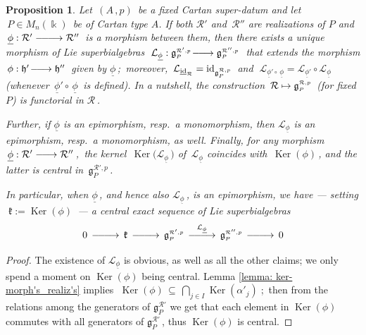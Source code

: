 \documentclass[12pt,reqno,twoside,a4paper]{amsart}
\numberwithin{equation}{section}
\newtheorem{prop}[lema]{Proposition}
\theoremstyle{definition}
\newtheorem{free text}[lema]{}
\theoremstyle{remark}
\newcommand \id{\operatorname{id}}
\newcommand \Ker{\operatorname{Ker}}
\newcommand{\R}{{\mathcal R}}
\newcommand{\Lc}{{\mathcal L}}
\def \Ppicc {{\scriptscriptstyle P}}
\def \lieg{\mathfrak{g}}
\def \liegRpP{\mathfrak{g}^{\raise1pt\hbox{$ \scriptscriptstyle \mathcal{R},p $}}_\Ppicc}
\def \lieh{\mathfrak{h}}
\def \liek{\mathfrak{k}}
\def \pf{\begin{proof}}
\def \epf{\end{proof}}
\theoremstyle{plain}
\begin{document}
\begin{prop}  \label{prop: functor_R->liegRP}
%
 Let  $ \, (A \, , p) \, $  be a fixed Cartan super-datum and let
 $ \, P \in M_n(\Bbbk) \, $ be of Cartan type $A$.
 If both  $ \R' $  and  $ \, \R'' $  are realizations of  $ P $  and
 $ \, \underline{\phi} : \R' \relbar\joinrel\relbar\joinrel\longrightarrow \R'' \, $  is a morphism between them, then there exists a unique morphism of Lie superbialgebras
 $ \; \Lc_{\underline{\phi}} : \lieg^{\scriptscriptstyle \R',p}_\Ppicc \!\relbar\joinrel\longrightarrow \lieg^{\scriptscriptstyle \R'',p}_\Ppicc \; $
 that extends the morphism
 $ \, \phi : \lieh' \!\relbar\joinrel\longrightarrow \lieh'' \, $
 given by  $ \underline{\phi} \, $;  \,moreover,
 $ \, \Lc_{\underline{\id}_\R} = \id_{\liegRpP} \, $  and
 $ \; \Lc_{\underline{\phi}' \circ\, \underline{\phi}} = \Lc_{\underline{\phi}'} \circ \Lc_{\underline{\phi}} \; $
 (whenever  $ \, \underline{\phi}' \circ\, \underline{\phi} \, $  is defined).
 In a nutshell, the construction  $ \, \R \mapsto \liegRpP \, $  (for fixed  $ P $)  is functorial in  $ \R \, $.
                                                                              \par
   Further, if  $ \underline{\phi} $  is an epimorphism, resp.\ a monomorphism, then
  $ \Lc_{\underline{\phi}} $  is an epimorphism, resp.\ a monomorphism, as well.
  Finally, for any morphism
  $ \, \underline{\phi} : \R' \relbar\joinrel\longrightarrow \R'' \, $,
  \,the kernel  $ \, \Ker\big(\Lc_{\underline{\phi}}\,\big) $  of
  $ \, \Lc_{\underline{\phi}} $  coincides with  $ \, \Ker(\phi) \, $,
  and the latter is central in
  $ \, \lieg^{\scriptscriptstyle \R',p}_\Ppicc \, $.
                                                                                \par
   In particular, when  $ \underline{\phi} \, $,  and hence also
   $ \Lc_{\underline{\phi}} \, $,  is an epimorphism, we have   ---
   setting  $ \; \liek := \Ker(\phi) \, $  ---
   a central exact sequence of Lie superbialgebras
%
  $$  0 \,\relbar\joinrel\relbar\joinrel\longrightarrow\, \liek
  \,\relbar\joinrel\relbar\joinrel\longrightarrow\, \lieg^{\scriptscriptstyle \R',p}_\Ppicc \,\;{\buildrel {\Lc_{\underline{\phi}}} \over {\relbar\joinrel\relbar\joinrel\longrightarrow}}\;\,
  \lieg^{\scriptscriptstyle \R'',p}_\Ppicc \,\relbar\joinrel\relbar\joinrel\longrightarrow\, 0  $$
%
\end{prop}

\pf
%
 The existence of  $ \Lc_{\underline{\phi}} $  is obvious, as well as all the other claims; we only spend a moment on  $ \Ker(\phi) $  being central.
 Lemma \ref{lemma: ker-morph's_realiz's}  implies
 $ \; \Ker(\phi) \, \subseteq \, \bigcap\limits_{j \in I} \Ker(\alpha'_j) \; $;
 \,then from the relations among the generators of
 $ \lieg^{\scriptscriptstyle \R'}_\Ppicc $  we get that each element in  $ \Ker(\phi) $  commutes with all generators of  $ \lieg^{\scriptscriptstyle \R'}_\Ppicc \, $,  thus  $ \Ker(\phi) $  is central.
%
\epf
\end{document}
